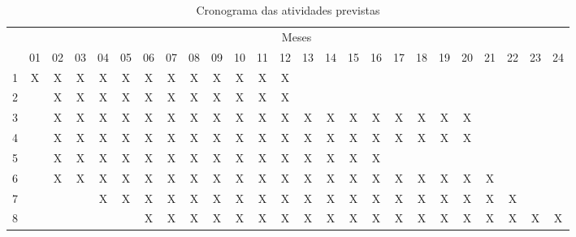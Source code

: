 \begin{table}[!htpb]
\centering

\begin{small} 
  
\setlength{\tabcolsep}{3pt} 


\begin{tabular}{|c|c|c|c|c|c|c|c|c|c|c|c|c|c|c|c|c|c|c|c|c|c|c|c|c|}\hline
 & \multicolumn{24}{c|}{Meses}\\ \cline{2-25}
\raisebox{1.5ex}{Etapa} & 01 & 02 & 03 & 04 & 05 & 06 & 07 & 08 & 09 & 10 & 11 & 12 & 13 & 14 & 15 & 16 & 17 & 18 & 19 & 20 & 21 & 22 & 23 & 24 \\ \hline

1 & X & X & X & X & X & X & X & X & X & X & X & X & & & & & & & & & & & & \\ \hline
2 & & X & X & X & X & X & X & X & X & X & X & X & & & & & & & & & & & & \\ \hline
3 & & X & X & X & X & X & X & X & X & X & X & X & X & X & X & X & X & X & X & X & & & & \\ \hline
4 & & X & X & X & X & X & X & X & X & X & X & X & X & X & X & X & X & X & X & X & & & & \\ \hline
5 & & X & X & X & X & X & X & X & X & X & X & X & X & X & X & X & & & & & & & & \\ \hline
6 & & X & X & X & X & X & X & X & X & X & X & X & X & X & X & X & X & X & X & X & X & & & \\ \hline
7 & & & & X & X & X & X & X & X & X & X & X & X & X & X & X & X & X & X & X & X & X & & \\ \hline
8 & & & & & & X & X & X & X & X & X & X & X & X & X & X & X & X & X & X & X & X & X & X \\ \hline

\end{tabular} 
\end{small}
\caption{Cronograma das atividades previstas}
\label{t_cronograma}
\end{table} 
